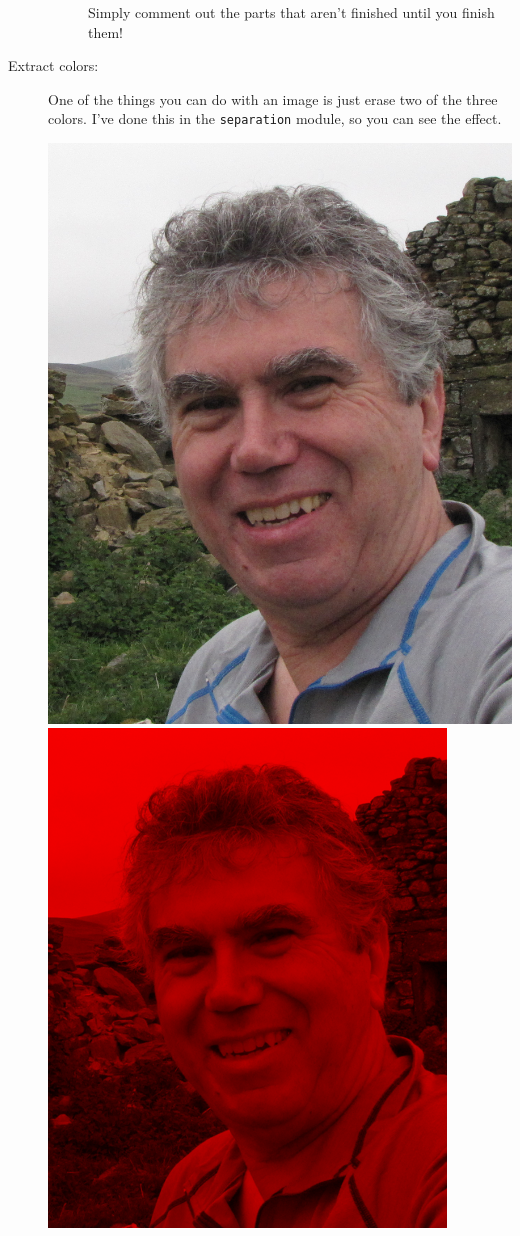 \documentclass[12pt]{article}
\begin{document}
\begin{description}
\begin{description}
Simply comment out the parts that aren't finished until you 
finish them!
\end{description}

\item[Extract colors:]  One of the things you can do with an image
is just erase two of the three colors.  I've done this in
the \lstinline{separation} module, so you can see the effect.

\includegraphics[scale=0.18]{geoffinscotland.png}
\includegraphics[scale=0.25]{red.png}

\end{description}
\end{document}
